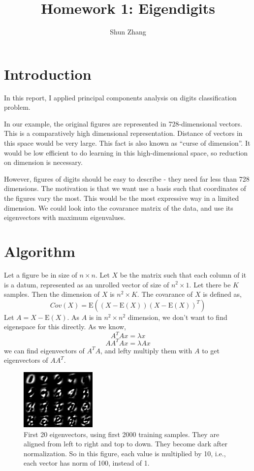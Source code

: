 \documentclass[10pt]{article}
\title{Homework 1: Eigendigits}
\author{Shun Zhang}
\date{}
\begin{document}
\maketitle

\section{Introduction}

In this report, I applied principal components analysis on digits
classification problem.

In our example, the original figures are represented in
728-dimensional vectors. This is a comparatively high dimensional
representation. Distance of vectors in this space would be very large.
This fact is also known as ``curse of dimension''. It would be low
efficient to do learning in this high-dimensional space, so reduction
on dimension is necessary.

However, figures of digits should be easy to describe - they need far
less than 728 dimensions. The motivation is that we want use a basis
such that coordinates of the figures vary the most. This would be the
most expressive way in a limited dimension. We could look into the
covarance matrix of the data, and use its eigenvectors with maximum
eigenvalues.

\section{Algorithm}

Let a figure be in size of $n \times n$. Let $X$ be the matrix such
that each column of it is a datum, represented as an unrolled vector
of size of $n^2 \times 1$. Let there be $K$ samples. Then the
dimension of $X$ is $n^2 \times K$. The covarance of $X$ is defined
as,
$$Cov(X) = \mathrm{E}((X - \mathrm{E}(X))(X - \mathrm{E}(X))^T)$$
Let $A = X - \mathrm{E}(X)$. As $A$ is in $n^2 \times n^2$ dimension,
we don't want to find eigenspace for this directly. As we know,
$$A^TAx = \lambda x$$
$$AA^TAx = \lambda Ax$$
we can find eigenvectors of $A^TA$, and lefty multiply them with $A$
to get eigenvectors of $AA^T$.

\begin{figure}
\centering
\includegraphics[]{eigen.png}
\caption{First 20 eigenvectors, using first 2000 training samples.
They are aligned from left to right and top to down. They become dark
after normalization. So in this figure, each value is multiplied by
10, i.e., each vector has norm of 100, instead of 1. }
\label{fig:eigen}
\end{figure}
\end{document}
